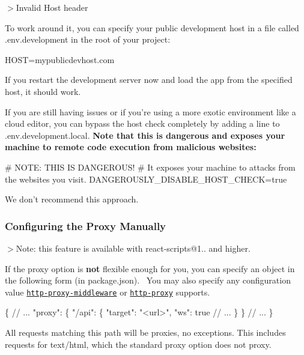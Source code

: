 $>$Invalid Host header

To work around it, you can specify your public development host in a file called {\ttfamily .env.\+development} in the root of your project\+:


\begin{DoxyCode}
HOST=mypublicdevhost.com
\end{DoxyCode}


If you restart the development server now and load the app from the specified host, it should work.

If you are still having issues or if you’re using a more exotic environment like a cloud editor, you can bypass the host check completely by adding a line to {\ttfamily .env.\+development.\+local}. {\bfseries Note that this is dangerous and exposes your machine to remote code execution from malicious websites\+:}


\begin{DoxyCode}
# NOTE: THIS IS DANGEROUS!
# It exposes your machine to attacks from the websites you visit.
DANGEROUSLY\_DISABLE\_HOST\_CHECK=true
\end{DoxyCode}


We don’t recommend this approach.

\subsubsection*{Configuring the Proxy Manually}

$>$Note\+: this feature is available with {\ttfamily react-\/scripts@1..} and higher.

If the {\ttfamily proxy} option is {\bfseries not} flexible enough for you, you can specify an object in the following form (in {\ttfamily package.\+json}).~\newline
 You may also specify any configuration value \href{https://github.com/chimurai/http-proxy-middleware#options}{\tt {\ttfamily http-\/proxy-\/middleware}} or \href{https://github.com/nodejitsu/node-http-proxy#options}{\tt {\ttfamily http-\/proxy}} supports. 
\begin{DoxyCode}
\{
  // ...
  "proxy": \{
    "/api": \{
      "target": "<url>",
      "ws": true
      // ...
    \}
  \}
  // ...
\}
\end{DoxyCode}


All requests matching this path will be proxies, no exceptions. This includes requests for {\ttfamily text/html}, which the standard {\ttfamily proxy} option does not proxy.

